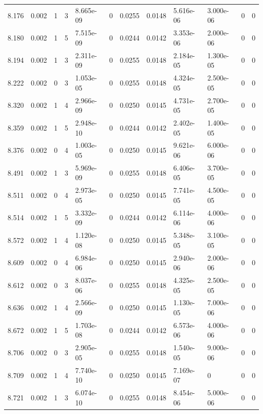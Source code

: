 \documentclass[preview]{standalone}
\begin{document}
{{{{{{\begin{tabular}{L{1.2cm}C{1.2cm} C{0.3cm}C{0.5cm} C{1.4cm}C{1.4cm} C{1.4cm}C{1.4cm} C{1.6cm}C{1.6cm} C{1.6cm}C{1.6cm}}
  8.176  &  0.002  & 1     &  3 &  8.665e-09  & 0  &  0.0255&   0.0148& 5.616e-06 & 3.000e-06   &  0 & 0  \\ 
  8.180  &  0.002  & 1     &  5 &  7.515e-09  & 0  &  0.0244&   0.0142& 3.353e-06 & 2.000e-06   &  0 & 0  \\ 
  8.194  &  0.002  & 1     &  3 &  2.311e-09  & 0  &  0.0255&   0.0148& 2.184e-05 & 1.300e-05   &  0 & 0  \\ 
  8.222  &  0.002  & 0     &  3 &  1.053e-05  & 0  &  0.0255&   0.0148& 4.324e-05 & 2.500e-05   &  0 & 0  \\ 
  8.320  &  0.002  & 1     &  4 &  2.966e-09  & 0  &  0.0250&   0.0145& 4.731e-05 & 2.700e-05   &  0 & 0  \\ 
  8.359  &  0.002  & 1     &  5 &  2.948e-10  & 0  &  0.0244&   0.0142& 2.402e-05 & 1.400e-05   &  0 & 0  \\ 
  8.376  &  0.002  & 0     &  4 &  1.003e-05  & 0  &  0.0250&   0.0145& 9.621e-06 & 6.000e-06   &  0 & 0  \\ 
  8.491  &  0.002  & 1     &  3 &  5.969e-09  & 0  &  0.0255&   0.0148& 6.406e-05 & 3.700e-05   &  0 & 0  \\ 
  8.511  &  0.002  & 0     &  4 &  2.973e-05  & 0  &  0.0250&   0.0145& 7.741e-05 & 4.500e-05   &  0 & 0  \\ 
  8.514  &  0.002  & 1     &  5 &  3.332e-09  & 0  &  0.0244&   0.0142& 6.114e-06 & 4.000e-06   &  0 & 0  \\ 
  8.572  &  0.002  & 1     &  4 &  1.120e-08  & 0  &  0.0250&   0.0145& 5.348e-05 & 3.100e-05   &  0 & 0  \\ 
  8.609  &  0.002  & 0     &  4 &  6.984e-06  & 0  &  0.0250&   0.0145& 2.940e-06 & 2.000e-06   &  0 & 0  \\ 
  8.612  &  0.002  & 0     &  3 &  8.037e-06  & 0  &  0.0255&   0.0148& 4.325e-05 & 2.500e-05   &  0 & 0  \\ 
  8.636  &  0.002  & 1     &  4 &  2.566e-09  & 0  &  0.0250&   0.0145& 1.130e-05 & 7.000e-06   &  0 & 0  \\ 
  8.672  &  0.002  & 1     &  5 &  1.703e-08  & 0  &  0.0244&   0.0142& 6.573e-06 & 4.000e-06   &  0 & 0  \\ 
  8.706  &  0.002  & 0     &  3 &  2.905e-05  & 0  &  0.0255&   0.0148& 1.540e-05 & 9.000e-06   &  0 & 0  \\ 
  8.709  &  0.002  & 1     &  4 &  7.740e-10  & 0  &  0.0250&   0.0145& 7.169e-07 & 0   &  0 & 0  \\ 
  8.721  &  0.002  & 1     &  3 &  6.074e-10  & 0  &  0.0255&   0.0148& 8.454e-06 & 5.000e-06   &  0 & 0  \\ 

\end{tabular}}}}}}}
\end{document}
